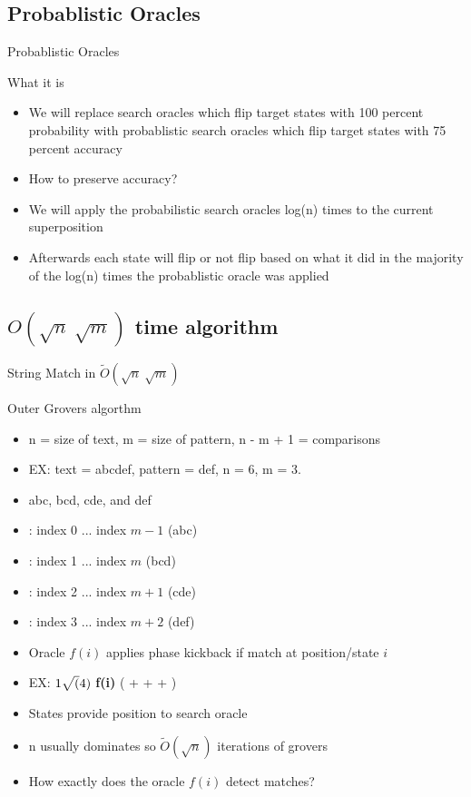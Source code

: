 \documentclass{beamer}
\begin{document}
\subsection{Probablistic Oracles}
\begin{frame}{Probablistic Oracles}
  \begin{block}{What it is}
    \begin{itemize}
      \item We will replace search oracles which flip target states with 100 percent probability with probablistic search oracles which flip target states with 75 percent accuracy
      \item How to preserve accuracy?
      \item We will apply the probabilistic search oracles log(n) times to the current superposition
      \item Afterwards each state will flip or not flip based on what it did in the majority of the log(n) times the probablistic oracle was applied
    \end{itemize}
  \end{block}
\end{frame}

\subsection{\(O(\sqrt{n}\ \sqrt{m})\) time algorithm}
\begin{frame}{String Match in \(\widetilde{O}(\sqrt{n}\ \sqrt{m} )\)}
  \begin{block}{Outer Grovers algorthm}
    \begin{itemize}
      \item n = size of text, m = size of pattern, n - m + 1 = comparisons
      \item EX: text = abcdef, pattern = def, n = 6, m = 3.
      \item abc, bcd, cde, and def
      \item {}: index 0 ... index \(m-1\) (abc)
      \item {}: index 1 ... index \(m\)   (bcd)
      \item {}: index 2 ... index \(m+1\) (cde)
      \item {}: index 3 ... index \(m+2\) (def)
      \item Oracle \(f(i)\) applies phase kickback if match at position/state \(i\)
      \item EX: \(1\/\sqrt(4)\) \textbf{f(i)} ( +  +  + )
      \item States provide position to search oracle
      \item n usually dominates so \(\widetilde{O}(\sqrt{n})\) iterations of grovers
      \item How exactly does the oracle \(f(i)\) detect matches?
    \end{itemize}
  \end{block}
\end{frame}
\end{document}
